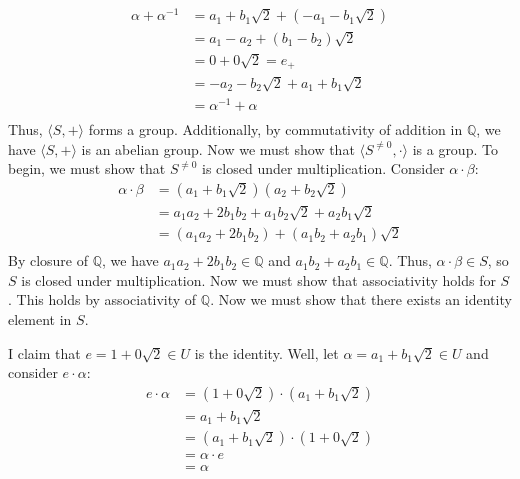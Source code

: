 \documentclass{article}
\begin{document}
\begin{align*}
    \alpha + \alpha^{-1} &= a_1 + b_1\sqrt{2} + (-a_1 - b_1\sqrt{2}) \\
    &= a_1 - a_2 + (b_1 - b_2)\sqrt{2} \\
    &= 0 + 0\sqrt{2} = e_+ \\
    &= -a_2 - b_2\sqrt{2} + a_1 + b_1\sqrt{2} \\
    &= \alpha^{-1} + \alpha \\
\end{align*}
Thus, $\langle S, + \rangle$ forms a group. Additionally, by commutativity of addition in $\mathbb{Q}$, we have $\langle S, + \rangle$ is an abelian group. Now we must show that $\langle S^{\neq 0}, \cdot \rangle$ is a group. To begin, we must show that $S^{\neq 0}$ is closed under multiplication. Consider $\alpha \cdot \beta$:
\begin{align*}
    \alpha \cdot \beta &= (a_1 + b_1\sqrt{2})(a_2 + b_2\sqrt{2}) \\
    &= a_1a_2 + 2b_1b_2 + a_1b_2\sqrt{2} + a_2b_1\sqrt{2} \\
    &=(a_1a_2 + 2b_1b_2) + (a_1b_2 + a_2b_1)\sqrt{2} \\
\end{align*}
By closure of $\mathbb{Q}$, we have $a_1a_2 + 2b_1b_2 \in \mathbb{Q}$ and $a_1b_2 + a_2b_1 \in \mathbb{Q}$. Thus, $\alpha \cdot \beta \in S$, so $S$ is closed under multiplication. Now we must show that associativity holds for $S$. This holds by associativity of $\mathbb{Q}$. Now we must show that there exists an identity element in $S$.

I claim that $e = 1 + 0\sqrt{2} \in U$ is the identity. Well, let $\alpha = a_1 + b_1\sqrt{2} \in U$ and consider $e \cdot \alpha$:
\begin{align*}
    e \cdot \alpha &= (1 + 0\sqrt{2})\cdot (a_1 + b_1\sqrt{2}) \\
    &= a_1 + b_1\sqrt{2} \\
    &= (a_1 + b_1\sqrt{2})\cdot (1 + 0\sqrt{2}) \\
    &= \alpha \cdot e \\
    &= \alpha \\
\end{align*}
\end{document}
